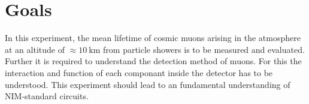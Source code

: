 \chapter{Goals}
\label{cha:Goals}
In this experiment, the mean lifetime of cosmic muons arising in the atmosphere at an altitude of $\approx \qty{10}{\kilo\meter}$ from particle showers
is to be measured and evaluated. Further it is required to understand the detection method of muons. For this the interaction and function of each componant inside the detector
has to be understood. This experiment should lead to an fundamental understanding of NIM-standard circuits.
